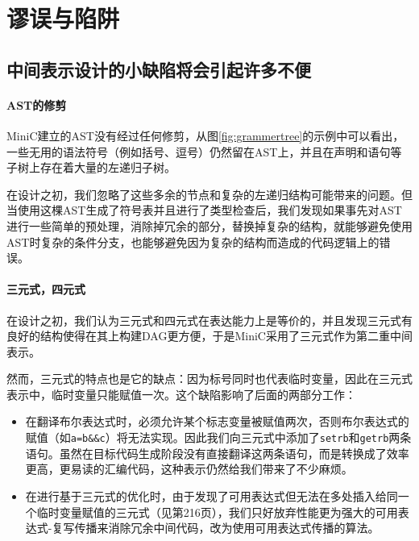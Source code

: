 \section{谬误与陷阱}
\label{pitfallc2}
\subsection*{中间表示设计的小缺陷将会引起许多不便}
\paragraph*{AST的修剪}
MiniC建立的AST没有经过任何修剪，从图\ref{fig:grammertree}的示例中可以看出，一些无用的语法符号（例如括号、逗号）仍然留在AST上，并且在声明和语句等子树上存在着大量的左递归子树。

在设计之初，我们忽略了这些多余的节点和复杂的左递归结构可能带来的问题。但当使用这棵AST生成了符号表并且进行了类型检查后，我们发现如果事先对AST进行一些简单的预处理，消除掉冗余的部分，替换掉复杂的结构，就能够避免使用AST时复杂的条件分支，也能够避免因为复杂的结构而造成的代码逻辑上的错误。

\paragraph*{三元式，四元式}
在设计之初，我们认为三元式和四元式在表达能力上是等价的，并且发现三元式有良好的结构使得在其上构建DAG更方便，于是MiniC采用了三元式作为第二重中间表示。

然而，三元式的特点也是它的缺点：因为标号同时也代表临时变量，因此在三元式表示中，临时变量只能赋值一次。这个缺陷影响了后面的两部分工作：
\begin{itemize}
\item 在翻译布尔表达式时，必须允许某个标志变量被赋值两次，否则布尔表达式的赋值（如\verb|a=b&&c|）将无法实现。因此我们向三元式中添加了\verb|setrb|和\verb|getrb|两条语句。虽然在目标代码生成阶段没有直接翻译这两条语句，而是转换成了效率更高，更易读的汇编代码，这种表示仍然给我们带来了不少麻烦。
\item 在进行基于三元式的优化时，由于发现了可用表达式但无法在多处插入给同一个临时变量赋值的三元式（见\cite{sunjiasu}第216页），我们只好放弃性能更为强大的可用表达式-复写传播来消除冗余中间代码，改为使用可用表达式传播的算法。
\end{itemize}
